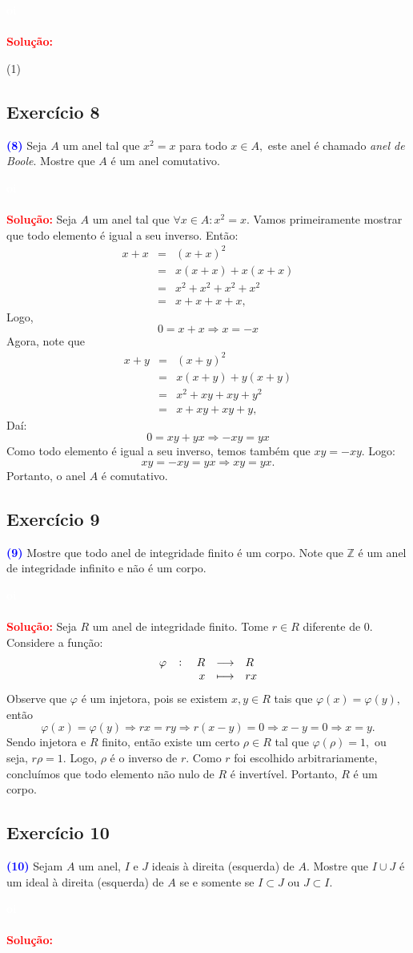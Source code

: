 \documentclass[11pt,a4paper]{article}
\newcommand{\exercicio}[1]{\subsection{Exercício #1} \textcolor{blue}{\bf(#1)}}
\newcommand{\dividiritens}[1]{\begin{tasks}[counter-format={(tsk[a])},label-width=3.6ex, label-format = {\bfseries}, column-sep = {0pt}](1) #1 \end{tasks}}
\newcommand{\pers}[1]{\textcolor{Floresta}{$\negrito{(#1)} $}}
\newcommand{\solucao}[1]{
\textbf{\textcolor{white}{oi}\\ \\ \textcolor{red}{Solução:}} #1}
\begin{document}
\solucao{
\dividiritens{
\task[\pers{a}]
}
}
\exercicio{8} Seja $A$ um anel tal que $x^2 = x$ para todo $x \in A,$ este anel é chamado \emph{anel de Boole}. Mostre que $A$ é um anel comutativo.
\solucao{
Seja $A$ um anel tal que $\forall x\in A:x^2=x$. Vamos primeiramente mostrar que todo elemento é igual a seu inverso. Então:
\[
\begin{array}{rcl}
x+x&=&(x+x)^2\\&=&x(x+x)+x(x+x)\\&=&x^2+x^2+x^2+x^2\\&=&x+x+x+x,
\end{array}
\]
Logo,
\[
0=x+x \Rightarrow x = -x
\]
Agora, note que
\[
\begin{array}{rcl}
x+y&=&(x+y)^2\\&=&x(x+y)+y(x+y)\\&=&x^2+xy+xy+y^2\\&=&x+xy+xy+y,
\end{array}
\]
Daí:
\[
0=xy+yx \Rightarrow -xy = yx
\]
Como todo elemento é igual a seu inverso, temos também que $xy = -xy.$ Logo:
\[
xy = -xy = yx \Rightarrow xy = yx.
\]
Portanto, o anel $A$ é comutativo.
}

\exercicio{9} Mostre que todo anel de integridade finito é um corpo. Note que $\mathbb{Z}$ é um anel de integridade infinito e não é um corpo.
\solucao{
Seja $R$ um anel de integridade finito. Tome $r \in R$ diferente de $0.$ Considere a função:
\[
\fullfunction{\varphi}{R}{R}{x}{rx}
\]
Observe que $\varphi$ é um injetora, pois se existem $x,y \in R$ tais que $\varphi(x) = \varphi(y),$ então
\[
\varphi(x) = \varphi(y) \Rightarrow rx = ry \Rightarrow r(x - y) = 0 \Rightarrow x - y = 0 \Rightarrow x = y.
\]
Sendo injetora e $R$ finito, então existe um certo $\rho \in R$ tal que $\varphi(\rho) = 1,$ ou seja, $r\rho = 1.$ Logo, $\rho$ é o inverso de $r.$ Como $r$ foi escolhido arbitrariamente, concluímos que todo elemento não nulo de $R$ é invertível. Portanto, $R$ é um corpo.
}
\exercicio{10} Sejam $A$ um anel, $I$ e $J$ ideais à direita (esquerda) de $A.$ Mostre que $I \cup J$ é um ideal à direita
(esquerda) de $A$ se e somente se $I \subset J$ ou $J \subset I.$
\solucao{}
\end{document}
